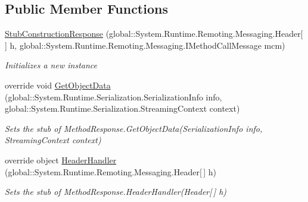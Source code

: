 \subsection*{Public Member Functions}
\begin{DoxyCompactItemize}
\item 
\hyperlink{class_system_1_1_runtime_1_1_remoting_1_1_messaging_1_1_fakes_1_1_stub_construction_response_a07d9da8c95ee2163264f495617298871}{Stub\-Construction\-Response} (global\-::\-System.\-Runtime.\-Remoting.\-Messaging.\-Header\mbox{[}$\,$\mbox{]} h, global\-::\-System.\-Runtime.\-Remoting.\-Messaging.\-I\-Method\-Call\-Message mcm)
\begin{DoxyCompactList}\small\item\em Initializes a new instance\end{DoxyCompactList}\item 
override void \hyperlink{class_system_1_1_runtime_1_1_remoting_1_1_messaging_1_1_fakes_1_1_stub_construction_response_abf5f6ed2fcb0ef0de0bacf1fe3ce3550}{Get\-Object\-Data} (global\-::\-System.\-Runtime.\-Serialization.\-Serialization\-Info info, global\-::\-System.\-Runtime.\-Serialization.\-Streaming\-Context context)
\begin{DoxyCompactList}\small\item\em Sets the stub of Method\-Response.\-Get\-Object\-Data(\-Serialization\-Info info, Streaming\-Context context)\end{DoxyCompactList}\item 
override object \hyperlink{class_system_1_1_runtime_1_1_remoting_1_1_messaging_1_1_fakes_1_1_stub_construction_response_a0c24f98352b178beeb3a9d7b0f52f580}{Header\-Handler} (global\-::\-System.\-Runtime.\-Remoting.\-Messaging.\-Header\mbox{[}$\,$\mbox{]} h)
\begin{DoxyCompactList}\small\item\em Sets the stub of Method\-Response.\-Header\-Handler(\-Header\mbox{[}$\,$\mbox{]} h)\end{DoxyCompactList}\end{DoxyCompactItemize}
